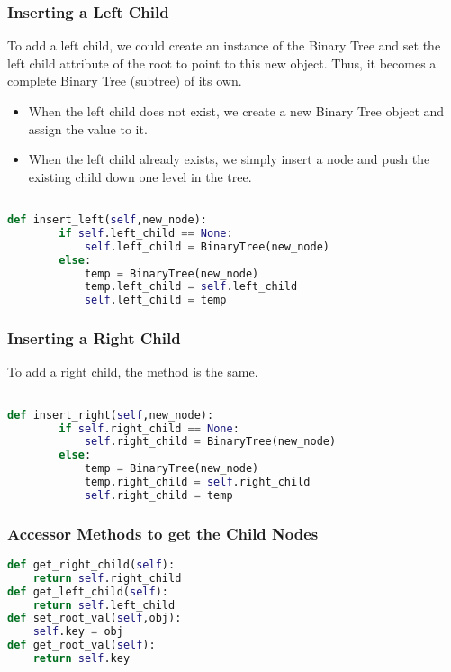 \documentclass{beamer}
\begin{document}
\begin{frame}[fragile]
\frametitle{Inserting a Left Child}
To add a left child, we could create an instance of the Binary Tree and set the left child attribute of the root to point to this new object.
Thus, it becomes a complete Binary Tree (subtree) of its own.

\begin{itemize}
\item When the left child does not exist, we create a new Binary Tree object and assign the value to it.
\item When the left child already exists, we simply insert a node and push the existing child down one level in the tree. 
\end{itemize}

\begin{lstlisting}[language=Python, keywordstyle=\color{blue}]

def insert_left(self,new_node):
        if self.left_child == None:
            self.left_child = BinaryTree(new_node)
        else:
            temp = BinaryTree(new_node)
            temp.left_child = self.left_child
            self.left_child = temp

\end{lstlisting}

\end{frame}


\begin{frame}[fragile]
\frametitle{Inserting a Right Child}
To add a right child, the method is the same.

\begin{lstlisting}[language=Python, keywordstyle=\color{blue}]

def insert_right(self,new_node):
        if self.right_child == None:
            self.right_child = BinaryTree(new_node)
        else:
            temp = BinaryTree(new_node)
            temp.right_child = self.right_child
            self.right_child = temp

\end{lstlisting}

\end{frame}

\begin{frame}[fragile]
\frametitle{Accessor Methods to get the Child Nodes}
\begin{lstlisting}[language=Python, keywordstyle=\color{blue}]
def get_right_child(self):
	return self.right_child
def get_left_child(self):
	return self.left_child
def set_root_val(self,obj):
	self.key = obj
def get_root_val(self):
	return self.key
\end{lstlisting}

\end{frame}
\end{document}
